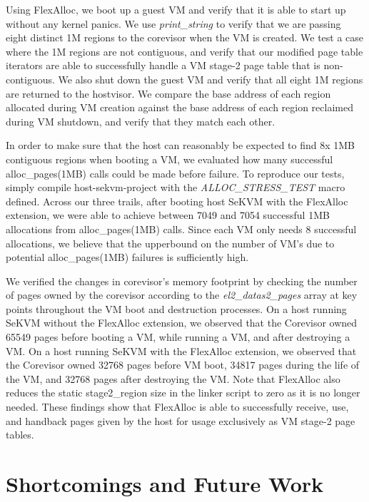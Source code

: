 Using FlexAlloc, we boot up a guest VM and verify that it is able to start up
without any kernel panics. We use \textit{print\_string} to verify that we
are passing eight distinct 1M regions to the corevisor when the VM is created.
We test a case where the 1M regions are not contiguous, and verify that our
modified page table iterators are able to successfully handle a VM stage-2 page
table that is non-contiguous. We also shut down the guest VM and verify that
all eight 1M regions are returned to the hostvisor. We compare the base address
of each region allocated during VM creation against the base address of each
region reclaimed during VM shutdown, and verify that they match each other.

In order to make sure that the host can reasonably be expected to find 8x 1MB
contiguous regions when booting a VM, we evaluated how many successful
alloc\_pages(1MB) calls could be made before failure. To reproduce our tests,
simply compile host-sekvm-project with the \textit{ALLOC\_STRESS\_TEST} macro defined.
Across our three trails, after booting host SeKVM with the FlexAlloc extension,
we were able to achieve between 7049 and 7054 successful 1MB allocations
from alloc\_pages(1MB) calls. Since each VM only needs 8 successful allocations,
we believe that the upperbound on the number of VM's due to potential alloc\_pages(1MB)
failures is sufficiently high.

We verified the changes in corevisor's memory footprint by checking the number of
pages owned by the corevisor according to the \textit{el2\_data\-\>s2\_pages} array at key points
throughout the VM boot and destruction processes. On a host running SeKVM without the
FlexAlloc extension, we observed that the Corevisor owned 65549 pages before booting a VM,
while running a VM, and after destroying a VM. On a host running SeKVM with the FlexAlloc
extension, we observed that the Corevisor owned 32768 pages before VM boot, 34817 pages
during the life of the VM, and 32768 pages after destroying the VM. Note that FlexAlloc also
reduces the static stage2\_region size in the linker script to zero as it is no longer needed.
These findings show that FlexAlloc is able to successfully receive, use, and handback pages
given by the host for usage exclusively as VM stage-2 page tables.

\section{Shortcomings and Future Work}


